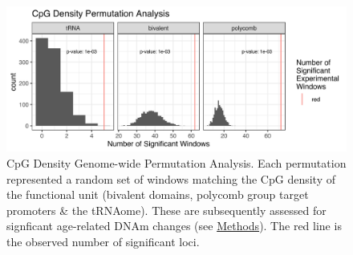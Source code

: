 \documentclass[
]{book}
\begin{document}
\begin{figure}

{\centering \includegraphics[width=1\linewidth]{figs/tRNA-poly-bivP_n1000_combined_perm_hist} 

}

\caption{CpG Density Genome-wide Permutation Analysis. Each permutation represented a random set of windows matching the CpG density of the functional unit (bivalent domains, polycomb group target promoters \& the tRNAome). These are subsequently assessed for signficant age-related DNAm changes (see \protect\hyperlink{AgeErichmentPermutation}{Methods}). The red line is the observed number of significant loci.}\label{fig:permHists}
\end{figure}



\begin{table}[t]

\caption{\label{tab:GWSBBtRNAsTab}Significantly Hypermethylating tRNAs in blood cell-type and batch corrected model MeDIP-seq. `Slope' corresponds to the beta value for methylation in the linear model.}
\centering
{}
\end{table}
\end{document}
